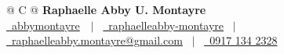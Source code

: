 \documentclass[a4paper, 10pt]{article}
\begin{document}
\pagestyle{empty} 



\begin{tabularx}{\linewidth}{@{} C @{}}
\textbf{\fontsize{18 pt}{18 pt}\selectfont Raphaelle Abby U. Montayre} \\
\vspace{0.05 cm}
\href{https://github.com/abbymontayre}{\color{black}\raisebox{-0.05\height}\faGithub\ abbymontayre}\ \ $|$ \ 
\href{https://linkedin.com/in/raphaelleabby-montayre}{\color{black}\raisebox{-0.05\height}\faLinkedin\ raphaelleabby-montayre} \ $|$ \ 
\href{mailto:raphaelleabby.montayre@gmail.com}{\color{black}\raisebox{-0.05\height}\faEnvelope\ raphaelleabby.montayre@gmail.com} \ $|$ \ 
\href{tel:+639171342328}{\color{black}\raisebox{-0.05\height}\faMobile\ 0917 134 2328} \\
\end{tabularx}

\end{document}
